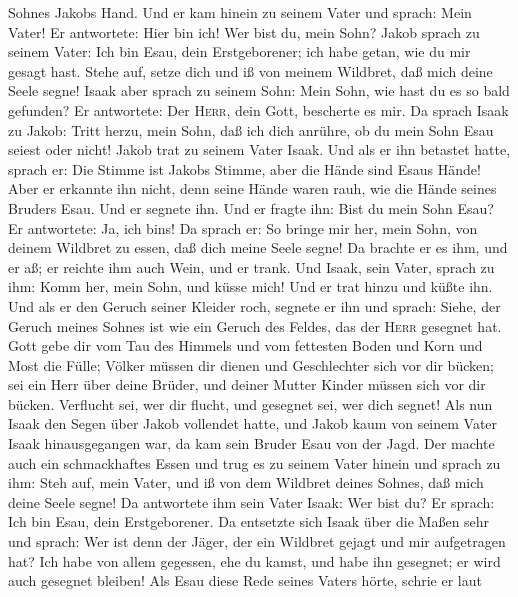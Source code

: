Sohnes Jakobs Hand.  Und er kam hinein zu seinem Vater
und sprach: Mein Vater! Er antwortete: Hier bin ich! Wer bist du, mein
Sohn?  Jakob sprach zu seinem Vater: Ich bin Esau, dein
Erstgeborener; ich habe getan, wie du mir gesagt hast. Stehe auf, setze
dich und iß von meinem Wildbret, daß mich deine Seele segne!
 Isaak aber sprach zu seinem Sohn: Mein Sohn, wie hast du
es so bald gefunden? Er antwortete: Der \textsc{Herr}, dein Gott,
bescherte es mir.  Da sprach Isaak zu Jakob: Tritt herzu,
mein Sohn, daß ich dich anrühre, ob du mein Sohn Esau seiest oder nicht!
 Jakob trat zu seinem Vater Isaak. Und als er ihn
betastet hatte, sprach er: Die Stimme ist Jakobs Stimme, aber die Hände
sind Esaus Hände!  Aber er erkannte ihn nicht, denn seine
Hände waren rauh, wie die Hände seines Bruders Esau. Und er segnete ihn.
 Und er fragte ihn: Bist du mein Sohn Esau? Er
antwortete: Ja, ich bin\textquotesingle s!  Da sprach er:
So bringe mir her, mein Sohn, von deinem Wildbret zu essen, daß dich
meine Seele segne! Da brachte er es ihm, und er aß; er reichte ihm auch
Wein, und er trank.  Und Isaak, sein Vater, sprach zu
ihm: Komm her, mein Sohn, und küsse mich!  Und er trat
hinzu und küßte ihn. Und als er den Geruch seiner Kleider roch, segnete
er ihn und sprach: Siehe, der Geruch meines Sohnes ist wie ein Geruch
des Feldes, das der \textsc{Herr} gesegnet hat.  Gott
gebe dir vom Tau des Himmels und vom fettesten Boden und Korn und Most
die Fülle;  Völker müssen dir dienen und Geschlechter
sich vor dir bücken; sei ein Herr über deine Brüder, und deiner Mutter
Kinder müssen sich vor dir bücken. Verflucht sei, wer dir flucht, und
gesegnet sei, wer dich segnet!  Als nun Isaak den Segen
über Jakob vollendet hatte, und Jakob kaum von seinem Vater Isaak
hinausgegangen war, da kam sein Bruder Esau von der Jagd.
 Der machte auch ein schmackhaftes Essen und trug es zu
seinem Vater hinein und sprach zu ihm: Steh auf, mein Vater, und iß von
dem Wildbret deines Sohnes, daß mich deine Seele segne! 
Da antwortete ihm sein Vater Isaak: Wer bist du? Er sprach: Ich bin
Esau, dein Erstgeborener.  Da entsetzte sich Isaak über
die Maßen sehr und sprach: Wer ist denn der Jäger, der ein Wildbret
gejagt und mir aufgetragen hat? Ich habe von allem gegessen, ehe du
kamst, und habe ihn gesegnet; er wird auch gesegnet bleiben!
 Als Esau diese Rede seines Vaters hörte, schrie er laut
